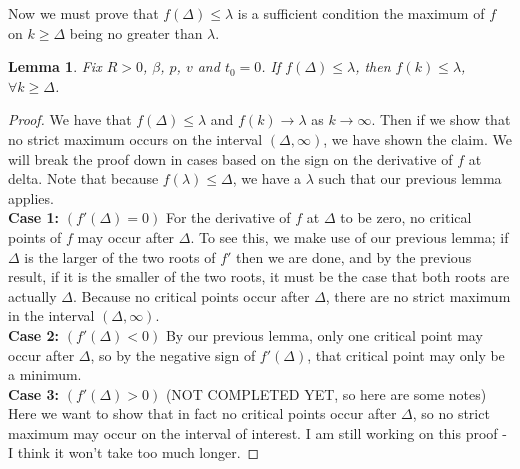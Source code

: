 \documentclass{article}
\newtheorem{lemma}{Lemma}[section]
\begin{document}
Now we must prove that $f(\Delta) \leq \lambda$ is a sufficient condition the maximum of $f$ on $k\geq \Delta$ being no greater than $\lambda$.

\begin{lemma}
Fix $R > 0$, $\beta$, $p$, $v$ and $t_0 = 0$. If $f(\Delta) \leq \lambda$, then $f(k) \leq \lambda$, $\forall k \geq \Delta$. 
\end{lemma}

\begin{proof}
We have that $f(\Delta) \leq \lambda$ and $f(k) \rightarrow \lambda$ as $k \rightarrow \infty$. Then if we show that no strict maximum occurs on the interval $(\Delta, \infty)$, we have shown the claim. We will break the proof down in cases based on the sign on the derivative of $f$ at delta. Note that because $f(\lambda) \leq \Delta$, we have a $\lambda$ such that our previous lemma applies. \\

\textbf{Case 1:} $(f'(\Delta) = 0)$ For the derivative of $f$ at $\Delta$ to be zero, no critical points of $f$ may occur after $\Delta$. To see this, we make use of our previous lemma; if $\Delta$ is the larger of the two roots of $f'$ then we are done, and by the previous result, if it is the smaller of the two roots, it must be the case that both roots are actually $\Delta$. Because no critical points occur after $\Delta$, there are no strict maximum in the interval $(\Delta, \infty)$. \\

\textbf{Case 2:} $(f'(\Delta) < 0)$ By our previous lemma, only one critical point may occur after $\Delta$, so by the negative sign of $f'(\Delta)$, that critical point may only be a minimum. \\

\textbf{Case 3:} $(f'(\Delta) > 0)$ (NOT COMPLETED YET, so here are some notes) Here we want to show that in fact no critical points occur after $\Delta$, so no strict maximum may occur on the interval of interest. I am still working on this proof - I think it won't take too much longer. 
\end{proof}
\end{document}
